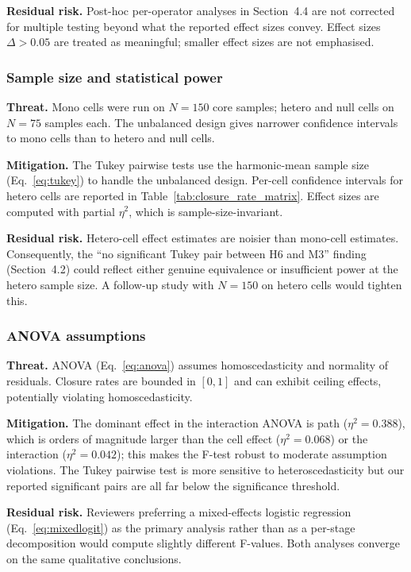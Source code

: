 \textbf{Residual risk.} Post-hoc per-operator analyses in Section~4.4 are not corrected for multiple testing beyond what the reported effect sizes convey. Effect sizes $\Delta > 0.05$ are treated as meaningful; smaller effect sizes are not emphasised.

\subsubsection{Sample size and statistical power}

\textbf{Threat.} Mono cells were run on $N = 150$ core samples; hetero and null cells on $N = 75$ samples each. The unbalanced design gives narrower confidence intervals to mono cells than to hetero and null cells.

\textbf{Mitigation.} The Tukey pairwise tests use the harmonic-mean sample size (Eq.~\ref{eq:tukey}) to handle the unbalanced design. Per-cell confidence intervals for hetero cells are reported in Table~\ref{tab:closure_rate_matrix}. Effect sizes are computed with partial $\eta^2$, which is sample-size-invariant.

\textbf{Residual risk.} Hetero-cell effect estimates are noisier than mono-cell estimates. Consequently, the ``no significant Tukey pair between H6 and M3'' finding (Section~4.2) could reflect either genuine equivalence or insufficient power at the hetero sample size. A follow-up study with $N = 150$ on hetero cells would tighten this.

\subsubsection{ANOVA assumptions}

\textbf{Threat.} ANOVA (Eq.~\ref{eq:anova}) assumes homoscedasticity and normality of residuals. Closure rates are bounded in $[0, 1]$ and can exhibit ceiling effects, potentially violating homoscedasticity.

\textbf{Mitigation.} The dominant effect in the interaction ANOVA is path ($\eta^2 = 0.388$), which is orders of magnitude larger than the cell effect ($\eta^2 = 0.068$) or the interaction ($\eta^2 = 0.042$); this makes the F-test robust to moderate assumption violations. The Tukey pairwise test is more sensitive to heteroscedasticity but our reported significant pairs are all far below the significance threshold.

\textbf{Residual risk.} Reviewers preferring a mixed-effects logistic regression (Eq.~\ref{eq:mixedlogit}) as the primary analysis rather than as a per-stage decomposition would compute slightly different F-values. Both analyses converge on the same qualitative conclusions.

